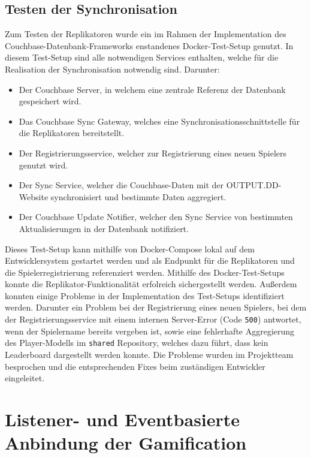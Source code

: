 \subsection{Testen der Synchronisation}

Zum Testen der Replikatoren wurde ein im Rahmen der Implementation des Couchbase-Datenbank-Frameworks enstandenes Docker-Test-Setup genutzt. In diesem Test-Setup sind alle notwendigen Services enthalten, welche für die Realisation der Synchronisation notwendig sind. Darunter:

\begin{itemize}
\item Der Couchbase Server, in welchem eine zentrale Referenz der Datenbank gespeichert wird.
\item Das Couchbase Sync Gateway, welches eine Synchronisationsschnittstelle für die Replikatoren bereitstellt.
\item Der Registrierungsservice, welcher zur Registrierung eines neuen Spielers genutzt wird.
\item Der Sync Service, welcher die Couchbase-Daten mit der OUTPUT.DD-Website synchronisiert und bestimmte Daten aggregiert.
\item Der Couchbase Update Notifier, welcher den Sync Service von bestimmten Aktualisierungen in der Datenbank notifiziert.
\end{itemize}

\noindent Dieses Test-Setup kann mithilfe von Docker-Compose lokal auf dem Entwicklersystem gestartet werden und als Endpunkt für die Replikatoren und die Spielerregistrierung referenziert werden. Mithilfe des Docker-Test-Setups konnte die Replikator-Funktionalität erfolreich sichergestellt werden. Außerdem konnten einige Probleme in der Implementation des Test-Setups identifiziert werden. Darunter ein Problem bei der Registrierung eines neuen Spielers, bei dem der Registrierungsservice mit einem internen Server-Error (Code \texttt{500}) antwortet, wenn der Spielername bereits vergeben ist, sowie eine fehlerhafte Aggregierung des Player-Modells im \texttt{shared} Repository, welches dazu führt, dass kein Leaderboard dargestellt werden konnte. Die Probleme wurden im Projektteam besprochen und die entsprechenden Fixes beim zuständigen Entwickler eingeleitet.

\section{Listener- und Eventbasierte Anbindung der Gamification}

